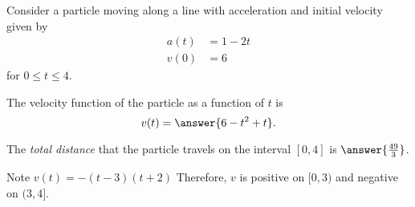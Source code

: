 \documentclass{ximera}
\author{Nela Lakos \and Kyle Parsons}
\begin{document}
\begin{exercise}

Consider a particle moving along a line with acceleration and initial velocity given by
\begin{align*}
	a(t) &= 1-2t\\
	v(0) &= 6
\end{align*}
for $0\leq t\leq4$.

The  velocity function of the particle as a function of $t$ is
\[
v(t) = \answer{6-t^2+t}.
\]

The \emph{total distance} that the particle travels on the interval $[0,4]$ is $\answer{\frac{49}{3}}$.
\begin{hint}
	Note $\displaystyle v(t)=-(t-3)(t+2)$
Therefore, $v$ is positive on $[0,3)$ and negative on $(3,4]$.
\end{hint}
\end{exercise}
\end{document}
